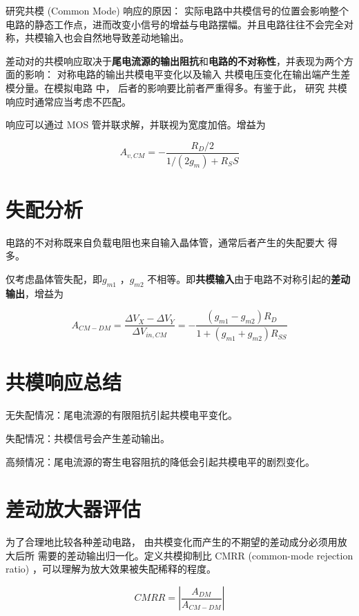 \documentclass[cn,11pt,chinese,black,simple]{../elegantbook}
\begin{document}
研究共模 (Common Mode) 响应的原因：
实际电路中共模信号的位置会影响整个电路的静态工作点，进而改变小信号的增益与电路摆幅。并且电路往往不会完全对称，共模输入也会自然地导致差动地输出。

差动对的共模响应取决于\textbf{尾电流源的输出阻抗}和\textbf{电路的不对称性}，并表现为两个方面的影响： 对称电路的输出共模电平变化以及输入
共模电压变化在输出端产生差模分量。在模拟电路
中， 后者的影响要比前者严重得多。有鉴于此， 研究
共模响应时通常应当考虑不匹配。

响应可以通过 MOS 管并联求解，并联视为宽度加倍。增益为

\[A_{v,CM} = - \frac{R_D/2}{1/(2 g_m)+R_SS}\]


\section{失配分析}

电路的不对称既来自负载电阻也来自输入晶体管，通常后者产生的失配要大
得多。

仅考虑晶体管失配，即\(g_{m1}\) ，\(g_{m2}\) 不相等。即\textbf{共模输入}由于电路不对称引起的\textbf{差动输出}，增益为

\[A_{CM-DM} = \frac{\Delta V_X - \Delta V_Y}{\Delta V_{in,CM}} = - \frac{(g_{m1}-g_{m2})R_D}{1+(g_{m1}+g_{m2})R_{SS}}\]



\section{共模响应总结}

无失配情况：尾电流源的有限阻抗引起共模电平变化。

失配情况：共模信号会产生差动输出。

高频情况：尾电流源的寄生电容阻抗的降低会引起共模电平的剧烈变化。


\section{差动放大器评估}

为了合理地比较各种差动电路， 由共模变化而产生的不期望的差动成分必须用放大后所
需要的差动输出归一化。定义共模抑制比 CMRR (common-mode rejection ratio) ，可以理解为放大效果被失配稀释的程度。

\[CMRR = \left|\frac{A_{DM}}{A_{CM-DM}} \right|\]
\end{document}
